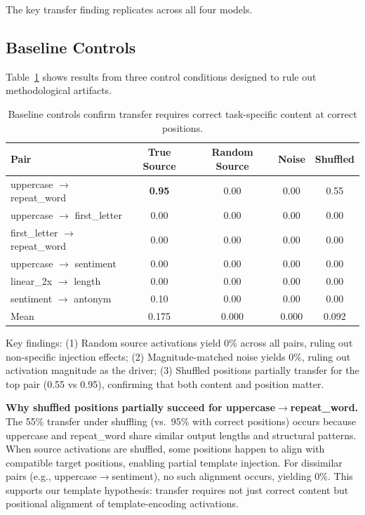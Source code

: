 \documentclass[sigconf,anonymous]{acmart}
\begin{document}
The key transfer finding replicates across all four models.

\subsection{Baseline Controls}

Table~\ref{tab:baseline_controls} shows results from three control conditions designed to rule out methodological artifacts.

\begin{table}[h]
\centering
\small
\caption{Baseline controls confirm transfer requires correct task-specific content at correct positions.}
\label{tab:baseline_controls}
\begin{tabular}{@{}lcccc@{}}
\toprule
Pair & True Source & Random Source & Noise & Shuffled \\
\midrule
uppercase $\to$ repeat\_word & \textbf{0.95} & 0.00 & 0.00 & 0.55 \\
uppercase $\to$ first\_letter & 0.00 & 0.00 & 0.00 & 0.00 \\
first\_letter $\to$ repeat\_word & 0.00 & 0.00 & 0.00 & 0.00 \\
uppercase $\to$ sentiment & 0.00 & 0.00 & 0.00 & 0.00 \\
linear\_2x $\to$ length & 0.00 & 0.00 & 0.00 & 0.00 \\
sentiment $\to$ antonym & 0.10 & 0.00 & 0.00 & 0.00 \\
\midrule
Mean & 0.175 & 0.000 & 0.000 & 0.092 \\
\bottomrule
\end{tabular}
\end{table}

Key findings: (1) Random source activations yield 0\% across all pairs, ruling out non-specific injection effects; (2) Magnitude-matched noise yields 0\%, ruling out activation magnitude as the driver; (3) Shuffled positions partially transfer for the top pair (0.55 vs 0.95), confirming that both content and position matter.

\textbf{Why shuffled positions partially succeed for uppercase$\to$repeat\_word.} The 55\% transfer under shuffling (vs.\ 95\% with correct positions) occurs because uppercase and repeat\_word share similar output lengths and structural patterns. When source activations are shuffled, some positions happen to align with compatible target positions, enabling partial template injection. For dissimilar pairs (e.g., uppercase$\to$sentiment), no such alignment occurs, yielding 0\%. This supports our template hypothesis: transfer requires not just correct content but positional alignment of template-encoding activations.
\end{document}
